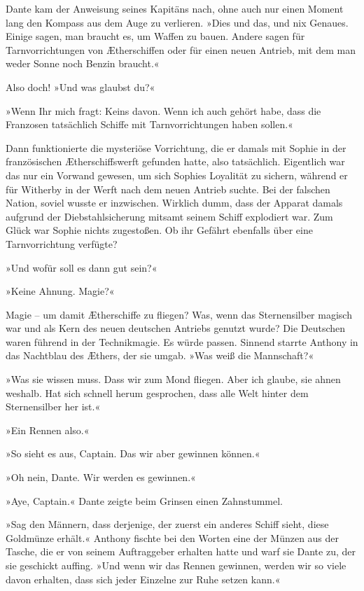 Dante kam der Anweisung seines Kapitäns nach, ohne auch nur einen
Moment lang den Kompass aus dem Auge zu verlieren. »Dies und das,
und nix Genaues. Einige sagen, man braucht es, um Waffen zu bauen.
Andere sagen für Tarnvorrichtungen von Ætherschiffen oder für einen
neuen Antrieb, mit dem man weder Sonne noch Benzin braucht.«

Also doch! »Und was glaubst du?«

»Wenn Ihr mich fragt: Keins davon. Wenn ich auch gehört habe, dass
die Franzosen tatsächlich Schiffe mit Tarnvorrichtungen haben
sollen.«

Dann funktionierte die mysteriöse Vorrichtung, die er damals mit
Sophie in der französischen Ætherschiffswerft gefunden hatte, also
tatsächlich. Eigentlich war das nur ein Vorwand gewesen, um sich
Sophies Loyalität zu sichern, während er für Witherby in der Werft
nach dem neuen Antrieb suchte. Bei der falschen Nation, soviel
wusste er inzwischen. Wirklich dumm, dass der Apparat damals
aufgrund der Diebstahlsicherung mitsamt seinem Schiff explodiert
war. Zum Glück war Sophie nichts zugestoßen. Ob ihr Gefährt
ebenfalls über eine Tarnvorrichtung verfügte?

»Und wofür soll es dann gut sein?«

»Keine Ahnung. Magie?«

Magie – um damit Ætherschiffe zu fliegen? Was, wenn das
Sternensilber magisch war und als Kern des neuen deutschen Antriebs
genutzt wurde? Die Deutschen waren führend in der Technikmagie. Es
würde passen. Sinnend starrte Anthony in das Nachtblau des Æthers,
der sie umgab. »Was weiß die Mannschaft?«

»Was sie wissen muss. Dass wir zum Mond fliegen. Aber ich glaube,
sie ahnen weshalb. Hat sich schnell herum gesprochen, dass alle
Welt hinter dem Sternensilber her ist.«

»Ein Rennen also.«

»So sieht es aus, Captain. Das wir aber gewinnen können.«

»Oh nein, Dante. Wir werden es gewinnen.«

»Aye, Captain.« Dante zeigte beim Grinsen einen Zahnstummel.

»Sag den Männern, dass derjenige, der zuerst ein anderes Schiff
sieht, diese Goldmünze erhält.« Anthony fischte bei den Worten eine
der Münzen aus der Tasche, die er von seinem Auftraggeber erhalten
hatte und warf sie Dante zu, der sie geschickt auffing. »Und wenn
wir das Rennen gewinnen, werden wir so viele davon erhalten, dass
sich jeder Einzelne zur Ruhe setzen kann.«

